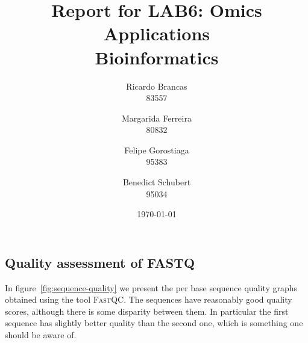 \documentclass[10pt,twocolumn]{article}\usepackage[]{graphicx}\usepackage[]{color}
\title{Report for LAB6: Omics Applications \\
\Large{Bioinformatics}}
\author{ Ricardo Brancas    \\ 83557
    \and Margarida Ferreira \\ 80832
    \and Felipe Gorostiaga  \\ 95383
    \and Benedict Schubert  \\ 95034}
\date{\today}
\begin{document}
\maketitle






\section{}

\subsection{Quality assessment of FASTQ}
In figure~\ref{fig:sequence-quality} we present the per base sequence quality graphs obtained using the tool \textsc{FastQC}. The sequences have reasonably good quality scores, although there is some disparity between them. In particular the first sequence has slightly better quality than the second one, which is something one should be aware of.
\end{document}

